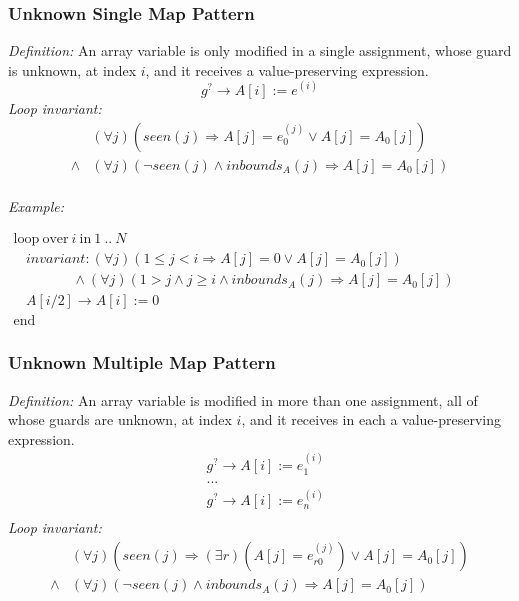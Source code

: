 \documentclass[a4paper,10pt]{article}
\newcommand{\idx}{\ensuremath{i}\xspace}
\newcommand{\at}[1]{{(#1)}}
\newcommand{\KWloop}{\ensuremath{\mathrm{loop}~}}
\newcommand{\KWend}{\ensuremath{\mathrm{end}~}}
\newcommand{\KWover}{\ensuremath{\mathrm{over}~}}
\newcommand{\KWin}{\ensuremath{~\mathrm{in}~}}
\newcommand{\impl}{\ensuremath{\Longrightarrow}}
\newcommand{\inbounds}[2]{\ensuremath{\mathit{inbounds}_{#1}(#2)}\xspace}
\newcommand{\seen}[1]{\ensuremath{\mathit{seen}(#1)}\xspace}
\newcommand{\loopinvariant}{\noindent\textit{Loop invariant:}\xspace}
\newcommand{\patterndef}{\noindent\textit{Definition:}\xspace}
\newcommand{\patternexample}{\noindent\textit{Example:}\xspace}
\begin{document}
\subsubsection*{Unknown Single Map Pattern}

\patterndef An array variable is only modified in a single assignment, whose
guard is unknown, at index \idx, and it receives a value-preserving expression.
%
$$g^? \rightarrow A[\idx] := e^\at{\idx}$$
%
\loopinvariant
%
\begin{eqnarray*}
&(\forall j)(\seen{j} \impl A[j] = e_0^\at{j} \lor A[j] = A_0[j]) \\
\land&
 (\forall j)(\neg \seen{j} \land \inbounds{A}{j} \impl A[j] = A_0[j])\\
\end{eqnarray*}

\bigskip
\patternexample

\medskip
$\begin{array}{l}
  \KWloop \KWover i \KWin 1~..~N \\
  ~~~~ \textit{invariant}: (\forall j)(1 \leq j < i \impl A[j] = 0 \lor A[j]=A_0[j])\\
  ~~~~~~~~~~~~~~~~~~~ \land (\forall j)(1 > j \land j \geq i \land \inbounds{A}{j} \impl A[j] = A_0[j])\\
  ~~~~ A[i/2] \rightarrow A[i] := 0\\
  \KWend
\end{array}$

\subsubsection*{Unknown Multiple Map Pattern}

\patterndef An array variable is modified in more than one assignment, all
of whose guards are unknown, at index \idx, and it receives in each a
value-preserving expression.
%
\begin{eqnarray*}
&g^? \rightarrow A[\idx] := e_1^\at{\idx}\\
&...\\
&g^? \rightarrow A[\idx] := e_n^\at{\idx}\\
\end{eqnarray*}
%
\loopinvariant
%
\begin{eqnarray*}
&(\forall j)(\seen{j} \impl (\exists r)(A[j] = e_{r0}^\at{j}) \lor A[j] = A_0[j]) \\
\land&
 (\forall j)(\neg \seen{j} \land \inbounds{A}{j} \impl A[j] = A_0[j])\\
\end{eqnarray*}
\end{document}
